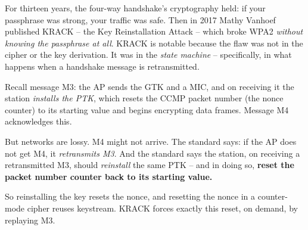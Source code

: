 For thirteen years, the four-way handshake's cryptography held: if your passphrase
was strong, your traffic was safe. Then in 2017 Mathy Vanhoef published KRACK --
the Key Reinstallation Attack -- which broke WPA2 \emph{without knowing the
passphrase at all}. KRACK is notable because the flaw was
not in the cipher or the key derivation. It was in the \emph{state machine} --
specifically, in what happens when a handshake message is retransmitted.

\begin{intuitionbox}
Recall message M3: the AP sends the GTK and a MIC, and on receiving it the station
\emph{installs the PTK}, which resets the CCMP packet number (the nonce counter)
to its starting value and begins encrypting data frames. Message M4 acknowledges
this.

But networks are lossy. M4 might not arrive. The standard says: if the AP does not
get M4, it \emph{retransmits M3}. And the standard says the station, on receiving
a retransmitted M3, should \emph{reinstall} the same PTK -- and in doing so,
\textbf{reset the packet number counter back to its starting value.}

So reinstalling the key resets the nonce, and resetting the nonce in a
counter-mode cipher reuses keystream. KRACK forces
exactly this reset, on demand, by replaying M3.
\end{intuitionbox}


